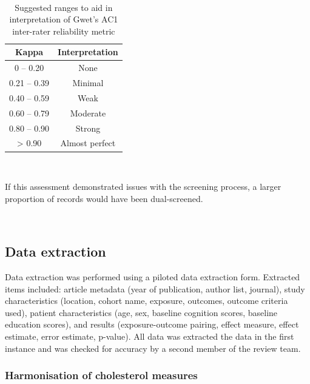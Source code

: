 \documentclass[a4paper, twoside]{templates/ociamthesis}
\begin{document}
~





\begin{table}[H]

\caption[Ranges for Gwet's AC1]{\label{tab:gwet-table}Suggested ranges to aid in interpretation of Gwet's AC1 inter-rater reliability metric}
\centering
\begin{tabular}[t]{cc}
\toprule
\textbf{Kappa} & \textbf{Interpretation}\\
\midrule
0    – 0.20 & None\\
\midrule
0.21 – 0.39 & Minimal\\
\midrule
0.40 – 0.59 & Weak\\
\midrule
0.60 – 0.79 & Moderate\\
\midrule
0.80 – 0.90 & Strong\\
\midrule
\addlinespace
> 0.90 & Almost perfect\\
\bottomrule
\end{tabular}
\end{table}

~

If this assessment demonstrated issues with the screening process, a larger proportion of records would have been dual-screened.

~

\hypertarget{data-extraction}{%
\subsection{Data extraction}\label{data-extraction}}

Data extraction was performed using a piloted data extraction form. Extracted items included: article metadata (year of publication, author list, journal), study characteristics (location, cohort name, exposure, outcomes, outcome criteria used), patient characteristics (age, sex, baseline cognition scores, baseline education scores), and results (exposure-outcome pairing, effect measure, effect estimate, error estimate, p-value). All data was extracted the data in the first instance and was checked for accuracy by a second member of the review team.

\hypertarget{harmonisation-of-cholesterol-measures}{%
\subsubsection{Harmonisation of cholesterol measures}\label{harmonisation-of-cholesterol-measures}}
\end{document}
